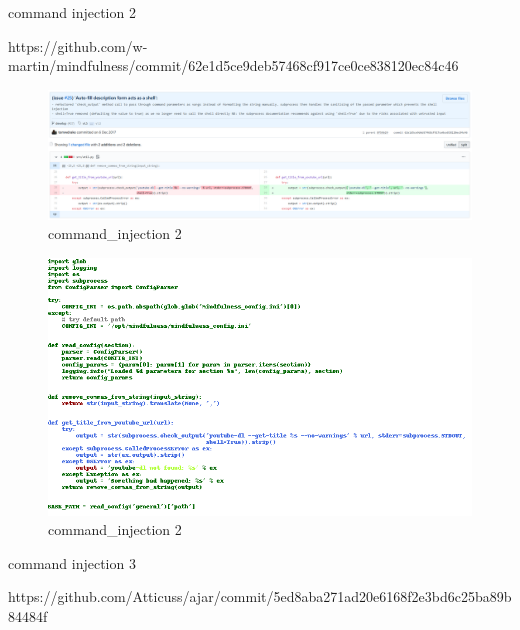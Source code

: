 \documentclass[
a4paper,
pagesize,
pdftex,
12pt,
twoside, %
BCOR=5mm, %
ngerman,
fleqn,
final,
]{scrartcl}
\begin{document}
command injection 2


https://github.com/w-martin/mindfulness/commit/62e1d5ce9deb57468cf917ce0ce838120ec84c46

\begin{figure}[h]
	\centering
	\includegraphics[width=\linewidth]{Images/command_injection2}
	\caption{command\_injection 2}
	\label{fig:command_injection2}
\end{figure}
\begin{figure}[h]
	\centering
	\includegraphics[width=\linewidth]{Images/command_injection2r}
	\caption{command\_injection 2}
	\label{fig:command_injection2r}
\end{figure}

command injection 3

https://github.com/Atticuss/ajar/commit/5ed8aba271ad20e6168f2e3bd6c25ba89b84484f
\end{document}
